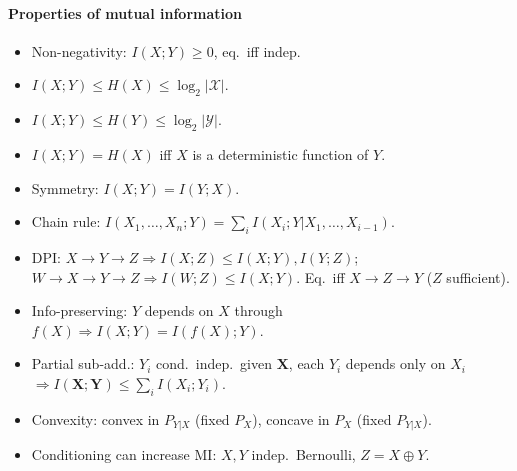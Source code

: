 \paragraph{Properties of mutual information}
\begin{itemize}
  \item \textcolor{Bittersweet}{Non-negativity}: $I(X;Y)\ge 0$, eq.\ iff indep.
  \item $I(X;Y)\le H(X)\le\log_2|\mathcal X|$.
  \item $I(X;Y)\le H(Y)\le\log_2|\mathcal Y|$.
  \item $I(X;Y)=H(X)$ iff $X$ is a deterministic function of $Y$.
  \item \textcolor{Bittersweet}{Symmetry}: $I(X;Y)=I(Y;X)$.
  \item \textcolor{Bittersweet}{Chain rule}: $I(X_1,\ldots,X_n;Y)=\sum_i I(X_i;Y|X_1,\ldots,X_{i-1})$.

  \item \textcolor{Bittersweet}{DPI}: $X\to Y\to Z\Rightarrow I(X;Z)\le I(X;Y),I(Y;Z)$; $W\to X\to Y\to Z\Rightarrow I(W;Z)\le I(X;Y)$. Eq.\ iff $X\to Z\to Y$ ($Z$ sufficient).
  \item \textcolor{Bittersweet}{Info-preserving}: $Y$ depends on $X$ through $f(X)\Rightarrow I(X;Y)=I(f(X);Y)$.
  \item \textcolor{Bittersweet}{Partial sub-add.}: $Y_i$ cond.\ indep.\ given $\mathbf X$, each $Y_i$ depends only on $X_i$ $\Rightarrow I(\mathbf X;\mathbf Y)\le\sum_i I(X_i;Y_i)$.
  \item \textcolor{Bittersweet}{Convexity}: convex in $P_{Y|X}$ (fixed $P_X$), concave in $P_X$ (fixed $P_{Y|X}$).
  \item \textcolor{Bittersweet}{Conditioning can increase MI}: $X,Y$ indep.\ Bernoulli, $Z=X\oplus Y$.
\end{itemize}
